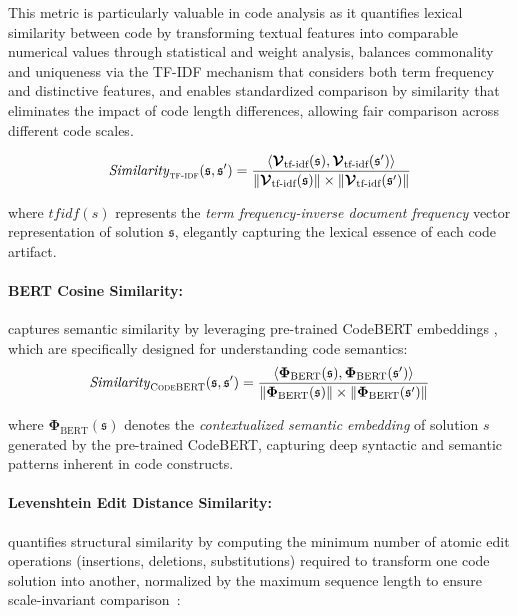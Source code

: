 \documentclass{article} %
\theoremstyle{definition}
\theoremstyle{remark}
\begin{document}
This metric is particularly valuable in code analysis as it quantifies lexical similarity between code by transforming textual features into comparable numerical values through statistical and weight analysis, balances commonality and uniqueness via the TF-IDF mechanism that considers both term frequency and distinctive features, and enables standardized comparison by similarity that eliminates the impact of code length differences, allowing fair comparison across different code scales.


\begin{equation}
\mathit{Similarity}_{\textsc{tf-idf}}(\mathfrak{s}, \mathfrak{s}') = \frac{\langle \boldsymbol{\mathcal{V}}_{\text{tf-idf}}(\mathfrak{s}), \boldsymbol{\mathcal{V}}_{\text{tf-idf}}(\mathfrak{s}') \rangle}{\left\|\boldsymbol{\mathcal{V}}_{\text{tf-idf}}(\mathfrak{s})\right\| \times \left\|\boldsymbol{\mathcal{V}}_{\text{tf-idf}}(\mathfrak{s}')\right\|}
\end{equation}


where $\boldsymbol{\mathit{tfidf}}(s)$ represents the \textit{term frequency-inverse document frequency} vector representation of solution $\mathfrak{s}$, elegantly capturing the lexical essence of each code artifact.


\paragraph{BERT Cosine Similarity:} captures semantic similarity by leveraging pre-trained CodeBERT embeddings \citep{feng2020codebert}, which are specifically designed for understanding code semantics:
\begin{equation}
\mathit{Similarity}_{\textsc{CodeBERT}}(\mathfrak{s}, \mathfrak{s}') = \frac{\langle \boldsymbol{\Phi}_{\text{BERT}}(\mathfrak{s}), \boldsymbol{\Phi}_{\text{BERT}}(\mathfrak{s}') \rangle}{\left\|\boldsymbol{\Phi}_{\text{BERT}}(\mathfrak{s})\right\| \times \left\|\boldsymbol{\Phi}_{\text{BERT}}(\mathfrak{s}')\right\|}
\end{equation}

where $\boldsymbol{\Phi}_{\text{BERT}}(\mathfrak{s})$ denotes the \textit{contextualized semantic embedding} of solution $s$ generated by the pre-trained CodeBERT, capturing deep syntactic and semantic patterns inherent in code constructs.



\paragraph{Levenshtein Edit Distance Similarity:} quantifies structural similarity by computing the minimum number of atomic edit operations (insertions, deletions, substitutions) required to transform one code solution into another, normalized by the maximum sequence length to ensure scale-invariant comparison~\citep{yujian2007normalized}:
\end{document}
